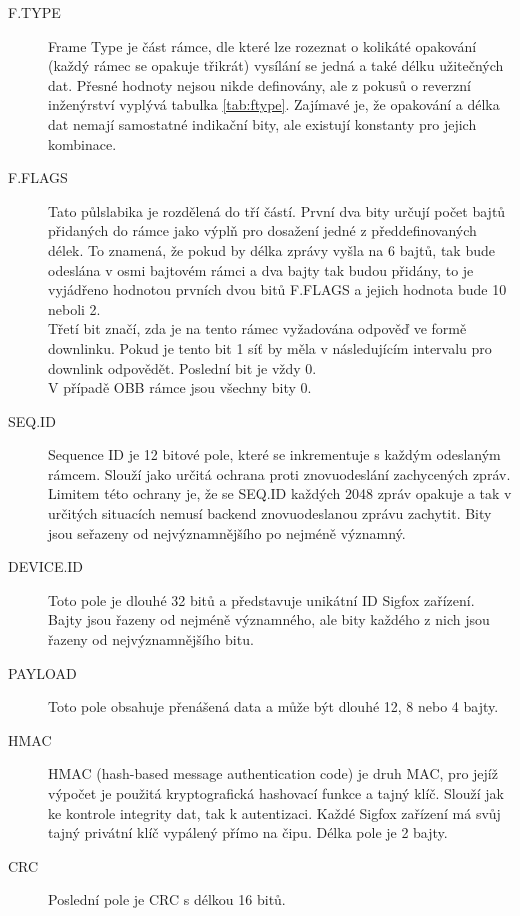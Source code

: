\documentclass{ctuthesis}
\begin{document}
\begin{description}
\item[F.TYPE]
Frame Type je část rámce, dle které lze rozeznat o kolikáté opakování (každý rámec se opakuje třikrát) vysílání se jedná a také délku užitečných dat. Přesné hodnoty nejsou nikde definovány, ale z pokusů o reverzní inženýrství  \cite{sigfoxprotocol} vyplývá tabulka \ref{tab:ftype}. Zajímavé je, že opakování a délka dat nemají samostatné indikační bity, ale existují konstanty pro jejich kombinace.
\item[F.FLAGS]
Tato půlslabika je rozdělená do tří částí. První dva bity určují počet bajtů přidaných do rámce jako výplň pro dosažení jedné z předdefinovaných délek. To znamená, že pokud by délka zprávy vyšla na 6 bajtů, tak bude odeslána v osmi bajtovém rámci a dva bajty tak budou přidány, to je vyjádřeno hodnotou prvních dvou bitů F.FLAGS a jejich hodnota bude 10 neboli 2.\\
Třetí bit značí, zda je na tento rámec vyžadována odpověď ve formě downlinku. Pokud je tento bit 1 síť by měla v následujícím intervalu pro downlink odpovědět. Poslední bit je vždy 0.\\
V případě OBB rámce jsou všechny bity 0.
\item[SEQ.ID]
Sequence ID je 12 bitové pole, které se inkrementuje s každým odeslaným rámcem. Slouží jako určitá ochrana proti znovuodeslání zachycených zpráv. Limitem této ochrany je, že se SEQ.ID každých 2048 zpráv opakuje a tak v určitých situacích nemusí backend znovuodeslanou zprávu zachytit. Bity jsou seřazeny od nejvýznamnějšího po nejméně významný.
\item[DEVICE.ID]
Toto pole je dlouhé 32 bitů a představuje unikátní ID Sigfox zařízení. Bajty jsou řazeny od nejméně významného, ale bity každého z nich jsou řazeny od nejvýznamnějšího bitu.
\item[PAYLOAD]
Toto pole obsahuje přenášená data a může být dlouhé 12, 8 nebo 4 bajty.
\item[HMAC]
HMAC (hash-based message authentication code) je druh MAC, pro jejíž výpočet je použitá kryptografická hashovací funkce a tajný klíč. Slouží jak ke kontrole integrity dat, tak k autentizaci. Každé Sigfox zařízení má svůj tajný privátní klíč vypálený přímo na čipu. Délka pole je 2 bajty.
\item[CRC]
Poslední pole je CRC s délkou 16 bitů.
\end{description}
\end{document}

